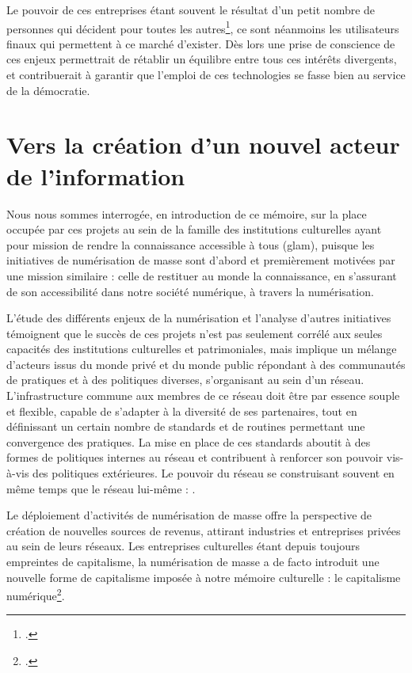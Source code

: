 Le pouvoir de ces entreprises étant souvent le résultat d'un petit nombre de personnes qui décident pour toutes les autres\footcite{thylstrup_politics_2018}, ce sont néanmoins les utilisateurs finaux qui permettent à ce marché d'exister. Dès lors une prise de conscience de ces enjeux permettrait de rétablir un équilibre entre tous ces intérêts divergents, et contribuerait à garantir que l'emploi de ces technologies se fasse bien au service de la démocratie.


\section {Vers la création d'un nouvel acteur de l'information}

Nous nous sommes interrogée, en introduction de ce mémoire, sur la place occupée par ces projets au sein de la famille des institutions culturelles ayant pour mission de rendre la connaissance accessible à tous (\gls{glam}), puisque les initiatives de numérisation de masse sont d'abord et premièrement motivées par une mission similaire : celle de restituer au monde la connaissance, en s'assurant de son accessibilité dans notre société numérique, à travers la numérisation.

L'étude des différents enjeux de la numérisation et l'analyse d'autres initiatives témoignent que le succès de ces projets n'est pas seulement corrélé aux seules capacités des institutions culturelles et patrimoniales, mais implique un mélange d'acteurs issus du monde privé et du monde public répondant à des communautés de pratiques et à des politiques diverses, s'organisant au sein d'un réseau. L'infrastructure commune aux membres de ce réseau doit être par essence souple et flexible, capable de s'adapter à la diversité de ses partenaires, tout en définissant un certain nombre de standards et de routines permettant une convergence des pratiques. La mise en place de ces standards aboutit à des formes de politiques internes au réseau et contribuent à renforcer son pouvoir vis-à-vis des politiques extérieures. Le pouvoir du réseau se construisant souvent en même temps que le réseau lui-même : .

Le déploiement d'activités de numérisation de masse offre la perspective de création de nouvelles sources de revenus, attirant industries et entreprises privées au sein de leurs réseaux. Les entreprises culturelles étant depuis toujours empreintes de capitalisme, la numérisation de masse a de facto introduit une nouvelle forme de capitalisme imposée à notre mémoire culturelle : le capitalisme numérique\footcite{thylstrup_politics_2018}. 

